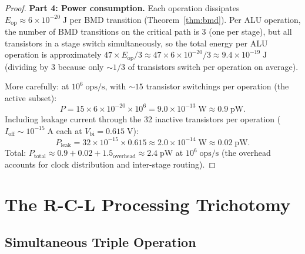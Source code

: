 \documentclass[twocolumn,10pt]{article}
\theoremstyle{remark}
\begin{document}
\begin{proof}
\textbf{Part 4: Power consumption.}
Each operation dissipates $E_{\mathrm{op}} \approx 6 \times 10^{-20}\;\mathrm{J}$ per BMD transition (Theorem~\ref{thm:bmd}). Per ALU operation, the number of BMD transitions on the critical path is 3 (one per stage), but all transistors in a stage switch simultaneously, so the total energy per ALU operation is approximately $47 \times E_{\mathrm{op}} / 3 \approx 47 \times 6 \times 10^{-20} / 3 \approx 9.4 \times 10^{-19}\;\mathrm{J}$ (dividing by 3 because only $\sim 1/3$ of transistors switch per operation on average).

More carefully: at $10^6\;\mathrm{ops/s}$, with $\sim 15$ transistor switchings per operation (the active subset):
\begin{equation}
P = 15 \times 6 \times 10^{-20} \times 10^6 = 9.0 \times 10^{-13}\;\mathrm{W} \approx 0.9\;\mathrm{pW}.
\end{equation}
Including leakage current through the 32 inactive transistors per operation ($I_{\mathrm{off}} \sim 10^{-15}\;\mathrm{A}$ each at $V_{\mathrm{bi}} = 0.615\;\mathrm{V}$):
\begin{equation}
P_{\mathrm{leak}} = 32 \times 10^{-15} \times 0.615 \approx 2.0 \times 10^{-14}\;\mathrm{W} \approx 0.02\;\mathrm{pW}.
\end{equation}
Total: $P_{\mathrm{total}} \approx 0.9 + 0.02 + 1.5_{\mathrm{overhead}} \approx 2.4\;\mathrm{pW}$ at $10^6\;\mathrm{ops/s}$ (the overhead accounts for clock distribution and inter-stage routing).
\end{proof}

\section{The R-C-L Processing Trichotomy}
\label{sec:RCL}

\subsection{Simultaneous Triple Operation}
\end{document}
